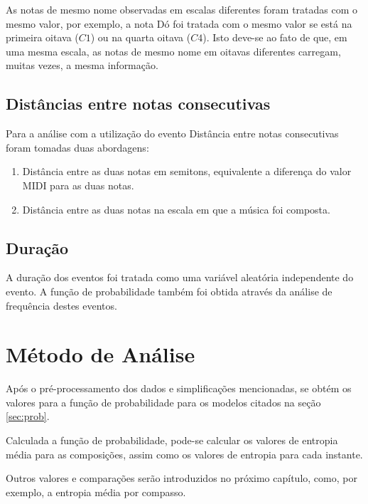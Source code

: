As notas de mesmo nome observadas em escalas diferentes foram tratadas com o mesmo valor, por exemplo, a nota Dó foi tratada com o mesmo valor se está na primeira oitava ($C1$) ou na quarta oitava ($C4$). Isto deve-se ao fato de que, em uma mesma escala, as notas de mesmo nome em oitavas diferentes carregam, muitas vezes, a mesma informação.

\subsection{Distâncias entre notas consecutivas}

Para a análise com a utilização do evento Distância entre notas consecutivas foram tomadas duas abordagens:

\begin{enumerate}
    \item Distância entre as duas notas em semitons, equivalente a diferença do valor MIDI para as duas notas.
    \item Distância entre as duas notas na escala em que a música foi composta.
\end{enumerate}

\subsection{Duração}

A duração dos eventos foi tratada como uma variável aleatória independente do evento. A função de probabilidade também foi obtida através da análise de frequência destes eventos.

\section{Método de Análise}

Após o pré-processamento dos dados e simplificações mencionadas, se obtém os valores para a função de probabilidade para os modelos citados na seção \ref{sec:prob}.

Calculada a função de probabilidade, pode-se calcular os valores de entropia média para as composições, assim como os valores de entropia para cada instante. 

Outros valores e comparações serão introduzidos no próximo capítulo, como, por exemplo, a entropia média por compasso.
